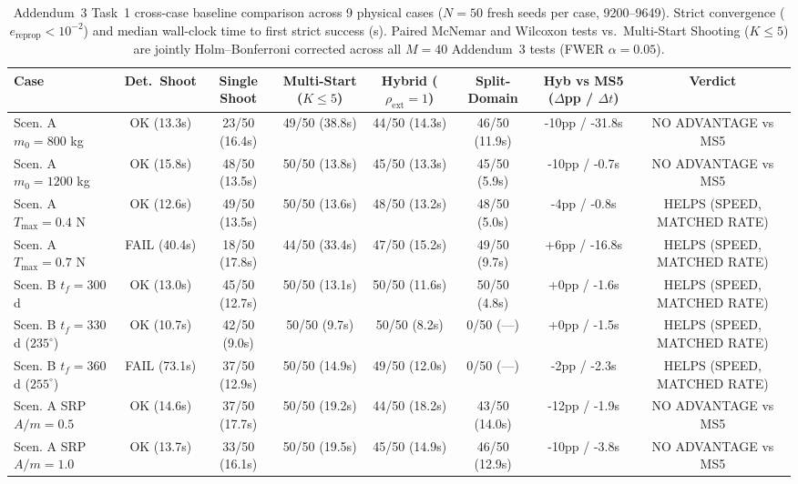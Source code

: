 \begin{table}[t]
\centering
\caption{Addendum~3 Task~1 cross-case baseline comparison across 9 physical cases ($N=50$ fresh seeds per case, 9200--9649). Strict convergence ($e_{\mathrm{reprop}} < 10^{-2}$) and median wall-clock time to first strict success (s). Paired McNemar and Wilcoxon tests vs.\ Multi-Start Shooting ($K \le 5$) are jointly Holm--Bonferroni corrected across all $M=40$ Addendum~3 tests (FWER $\alpha=0.05$).}
\label{tab:addendum3_cross_case}
\begin{tabular}{lccccccc}
\toprule
Case & Det.\ Shoot & Single Shoot & Multi-Start ($K\le 5$) & Hybrid ($\rho_{\mathrm{ext}}=1$) & Split-Domain & Hyb vs MS5 ($\Delta$pp / $\Delta t$) & Verdict \\
\midrule
Scen. A $m_0=800$ kg & OK (13.3s) & 23/50 (16.4s) & 49/50 (38.8s) & 44/50 (14.3s) & 46/50 (11.9s) & -10pp / -31.8s & NO ADVANTAGE vs MS5 \\
Scen. A $m_0=1200$ kg & OK (15.8s) & 48/50 (13.5s) & 50/50 (13.8s) & 45/50 (13.3s) & 45/50 (5.9s) & -10pp / -0.7s & NO ADVANTAGE vs MS5 \\
Scen. A $T_{\max}=0.4$ N & OK (12.6s) & 49/50 (13.5s) & 50/50 (13.6s) & 48/50 (13.2s) & 48/50 (5.0s) & -4pp / -0.8s & HELPS (SPEED, MATCHED RATE) \\
Scen. A $T_{\max}=0.7$ N & FAIL (40.4s) & 18/50 (17.8s) & 44/50 (33.4s) & 47/50 (15.2s) & 49/50 (9.7s) & +6pp / -16.8s & HELPS (SPEED, MATCHED RATE) \\
Scen. B $t_f=300$ d & OK (13.0s) & 45/50 (12.7s) & 50/50 (13.1s) & 50/50 (11.6s) & 50/50 (4.8s) & +0pp / -1.6s & HELPS (SPEED, MATCHED RATE) \\
Scen. B $t_f=330$ d ($235^\circ$) & OK (10.7s) & 42/50 (9.0s) & 50/50 (9.7s) & 50/50 (8.2s) & 0/50 (---) & +0pp / -1.5s & HELPS (SPEED, MATCHED RATE) \\
Scen. B $t_f=360$ d ($255^\circ$) & FAIL (73.1s) & 37/50 (12.9s) & 50/50 (14.9s) & 49/50 (12.0s) & 0/50 (---) & -2pp / -2.3s & HELPS (SPEED, MATCHED RATE) \\
Scen. A SRP $A/m=0.5$ & OK (14.6s) & 37/50 (17.7s) & 50/50 (19.2s) & 44/50 (18.2s) & 43/50 (14.0s) & -12pp / -1.9s & NO ADVANTAGE vs MS5 \\
Scen. A SRP $A/m=1.0$ & OK (13.7s) & 33/50 (16.1s) & 50/50 (19.5s) & 45/50 (14.9s) & 46/50 (12.9s) & -10pp / -3.8s & NO ADVANTAGE vs MS5 \\
\bottomrule
\end{tabular}
\end{table}
